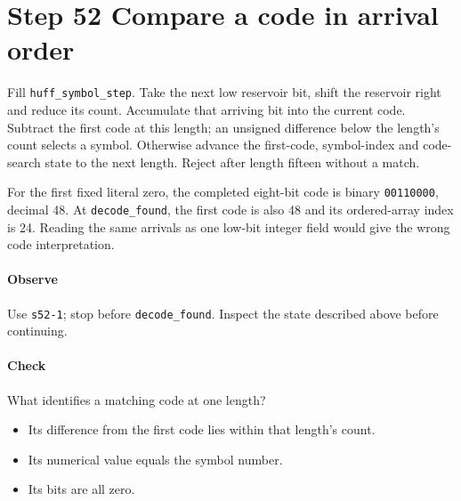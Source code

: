 \section{Step 52 Compare a code in arrival order}\label{png-huff-s52}
Fill \texttt{huff\_symbol\_step}. Take the next low reservoir bit, shift the reservoir right and reduce its count. Accumulate that arriving bit into the current code. Subtract the first code at this length; an unsigned difference below the length's count selects a symbol. Otherwise advance the first-code, symbol-index and code-search state to the next length. Reject after length fifteen without a match.

For the first fixed literal zero, the completed eight-bit code is binary \texttt{00110000}, decimal 48. At \texttt{decode\_found}, the first code is also 48 and its ordered-array index is 24. Reading the same arrivals as one low-bit integer field would give the wrong code interpretation.

\paragraph{Observe} Use \texttt{s52-1}; stop before \texttt{decode\_found}. Inspect the state described above before continuing.

\paragraph{Check} What identifies a matching code at one length?
\begin{itemize}
  \item[A.] Its difference from the first code lies within that length’s count.
  \item[B.] Its numerical value equals the symbol number.
  \item[C.] Its bits are all zero.
\end{itemize}
